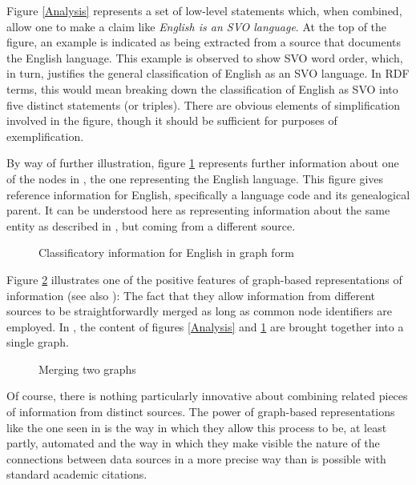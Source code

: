 \nocite{QuirkEtAl:1985}

Figure \ref{Analysis} represents a set of low-level statements which, when
combined, allow one to make a claim like \emph{English is an SVO language}. At
the top of the figure, an example is indicated as being extracted from a source
that documents the English language. This example is observed to show SVO word
order, which, in turn, justifies the general classification of English as an SVO
language. In RDF terms, this would mean breaking down the classification of
English as SVO into five distinct statements (or triples). There are obvious
elements of simplification involved in the figure, though it should be
sufficient for purposes of exemplification.

By way of further illustration, figure \ref{Genealogy} represents further
information about one of the nodes in , the one representing the
English language. This figure gives reference information for English,
specifically a language code and its genealogical parent. It can be understood
here as representing information about the same entity as described in
, but coming from a different source.

\begin{figure}[ht]
\centering
{}
\caption{Classificatory information for English in graph form \label{Genealogy}}
\end{figure}

Figure \ref{Merger} illustrates one of the positive features of graph-based
representations of information (see also ): The fact that they
allow information from different sources to be straightforwardly merged as
long as common node identifiers are employed. In , the content
of figures \ref{Analysis} and \ref{Genealogy} are brought together into a single
graph.

\begin{figure}[ht]
\centering
{}
\caption{Merging two graphs \label{Merger}}
\end{figure}

Of course, there is nothing particularly innovative about combining related
pieces of information from distinct sources. The power of graph-based
representations like the one seen in  is the way in which they
allow this process to be, at least partly, automated and the way in which they
make visible the nature of the connections between data sources in a more
precise way than is possible with standard academic citations.

